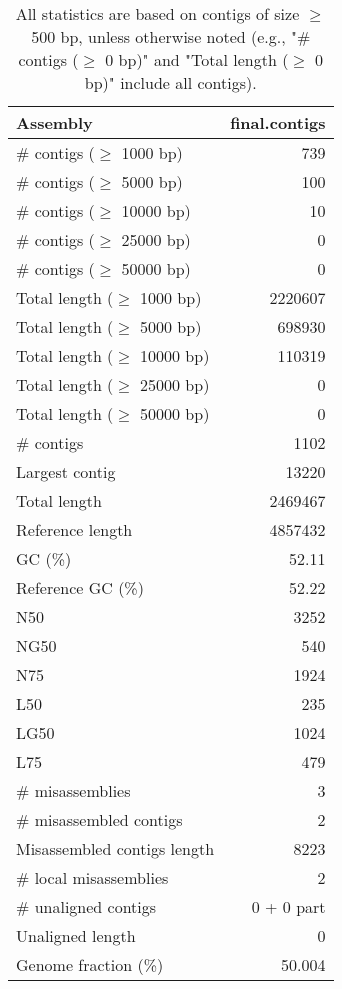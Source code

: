 \documentclass[12pt,a4paper]{article}
\begin{document}
\begin{table}[ht]
\begin{center}
\caption{All statistics are based on contigs of size $\geq$ 500 bp, unless otherwise noted (e.g., "\# contigs ($\geq$ 0 bp)" and "Total length ($\geq$ 0 bp)" include all contigs).}
\begin{tabular}{|l*{1}{|r}|}
\hline
Assembly & final.contigs \\ \hline
\# contigs ($\geq$ 1000 bp) & 739 \\ \hline
\# contigs ($\geq$ 5000 bp) & 100 \\ \hline
\# contigs ($\geq$ 10000 bp) & 10 \\ \hline
\# contigs ($\geq$ 25000 bp) & 0 \\ \hline
\# contigs ($\geq$ 50000 bp) & 0 \\ \hline
Total length ($\geq$ 1000 bp) & 2220607 \\ \hline
Total length ($\geq$ 5000 bp) & 698930 \\ \hline
Total length ($\geq$ 10000 bp) & 110319 \\ \hline
Total length ($\geq$ 25000 bp) & 0 \\ \hline
Total length ($\geq$ 50000 bp) & 0 \\ \hline
\# contigs & 1102 \\ \hline
Largest contig & 13220 \\ \hline
Total length & 2469467 \\ \hline
Reference length & 4857432 \\ \hline
GC (\%) & 52.11 \\ \hline
Reference GC (\%) & 52.22 \\ \hline
N50 & 3252 \\ \hline
NG50 & 540 \\ \hline
N75 & 1924 \\ \hline
L50 & 235 \\ \hline
LG50 & 1024 \\ \hline
L75 & 479 \\ \hline
\# misassemblies & 3 \\ \hline
\# misassembled contigs & 2 \\ \hline
Misassembled contigs length & 8223 \\ \hline
\# local misassemblies & 2 \\ \hline
\# unaligned contigs & 0 + 0 part \\ \hline
Unaligned length & 0 \\ \hline
Genome fraction (\%) & 50.004 \\ \hline

\end{tabular}
\end{center}
\end{table}
\end{document}
